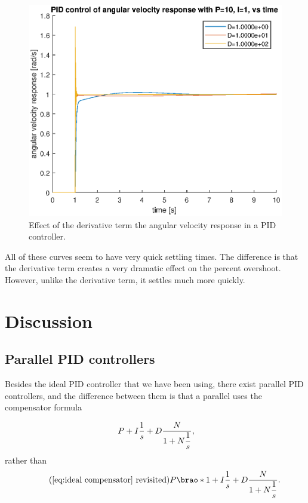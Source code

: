 \documentclass[12pt]{article}
\DeclarePairedDelimiter\brao()%
\begin{document}
\begin{figure}
    \centering
    \includegraphics[width=\linewidth]{img/task03_varying_d.eps}
    \caption{Effect of the derivative term the angular velocity response in a PID controller.}
    \label{fig:d on angular velocity}
\end{figure}

All of these curves seem to have very quick settling times. The difference is that the derivative term creates a very dramatic effect on the percent overshoot. However, unlike the derivative term, it settles much more quickly.

\section{Discussion}

\subsection{Parallel PID controllers}

Besides the ideal PID controller that we have been using,
there exist parallel PID controllers,
and the difference between them
is that a parallel uses the compensator formula

\begin{equation}
    P + I\frac1s + D\frac{N}{\displaystyle1 + N\frac1s}\rlap,
\end{equation}
rather than
\begin{equation*}\tag{\ref{eq:ideal compensator} revisited}
    P\brao*{1 + I\frac1s + D\frac{N}{\displaystyle1 + N\frac1s}}\rlap.
\end{equation*}
\end{document}
